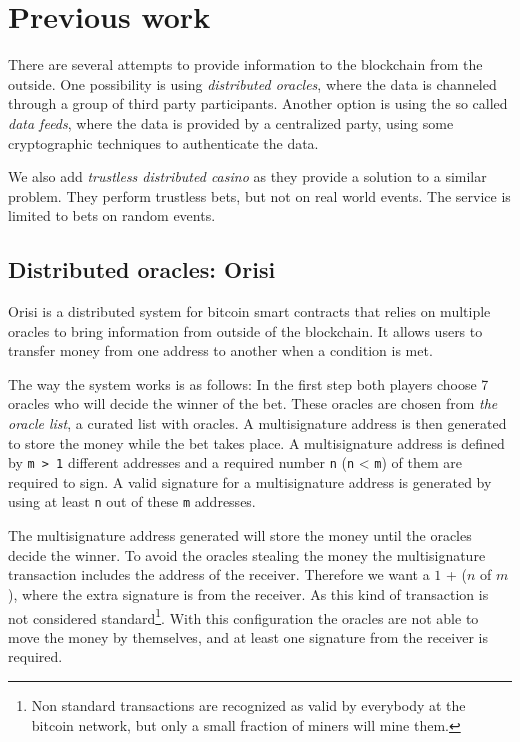 \section{Previous work} \label{sec:previous_work}

There are several attempts to provide information to the blockchain from the
  outside.
One possibility is using  \textit{distributed oracles}, where the data is channeled
  through a group of third party participants.
Another option is using the so called \textit{data feeds}, where the data is provided
  by a centralized party, using some cryptographic techniques to authenticate
  the data.

We also add \textit{trustless distributed casino} as they provide a solution to a
  similar problem.
They perform trustless bets, but not on real world events.
The service is limited to bets on random events.

\subsection{Distributed oracles: Orisi}
Orisi \cite{orisiwhitepaper} is a distributed system for bitcoin smart
  contracts that relies on multiple oracles to bring information from outside
  of the blockchain.
It allows users to transfer money from one address to another when a condition
  is met.

The way the system works is as follows:
In the first step both players choose 7 oracles who will decide the winner of
  the bet.
These oracles are chosen from \textit{the oracle list}, a curated list with oracles.
A multisignature address is then generated to store the money while the bet
  takes place.
A multisignature address is defined by \texttt{m > 1} different addresses and a
  required number \texttt{n} (\texttt{n} < \texttt{m}) of them are required to
  sign.
A valid signature for a multisignature address is generated by using at least
  \texttt{n} out of these \texttt{m} addresses.

The multisignature address generated will store the money until the oracles
  decide the winner.
To avoid the oracles stealing the money the multisignature transaction includes
  the address of the receiver.
Therefore we want a $1$ + ($n$ of $m$), where the extra signature is
  from the receiver.
As this kind of transaction is not considered
  standard\footnote{Non standard transactions are recognized as valid
  by everybody at the bitcoin network, but only a small fraction of
  miners will mine them.}.
 With this configuration the oracles are
  not able to move the money by themselves, and at least one signature
  from the receiver is required.

